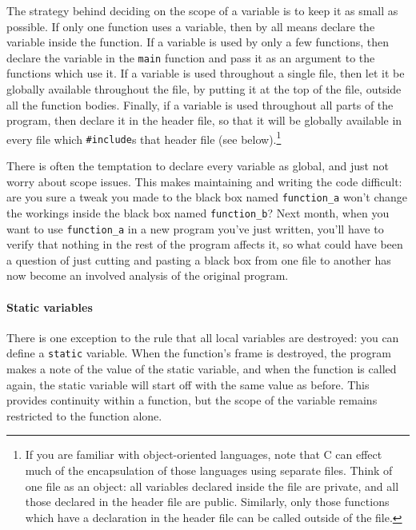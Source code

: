\documentclass[12pt]{article}
\begin{document}
The strategy behind deciding on the scope of a variable is
to keep it as small as possible. If only one function uses a variable,
then by all means declare the variable inside the function.
If a variable is used by only a few functions,
then declare the variable in the {\tt main} function and pass it as an
argument to the functions which use it. If a variable is used throughout
a single file, then let it be globally available throughout the file, by
putting it at the top of the file, outside all the function bodies. Finally,
if a variable is used throughout all parts of the program, then declare it in
the header file, so that it will be globally available in every
file which {\tt \#include}s that header file (see below).\footnote{If
you are familiar with object-oriented languages, note that C can effect
much of the encapsulation of those languages using separate files. Think
of one file as an object: all variables declared inside the file are
private, and all those declared in the header file are public. Similarly,
only those functions which have a declaration in the header file can be
called outside of the file.}

There is often the temptation to declare every variable as global, and
just not worry about scope issues. This makes maintaining and writing
the code difficult: are you sure a tweak you made to the black box named
{\tt function\_a} won't change the workings inside the black box named
{\tt function\_b}? Next month, when you want to use {\tt function\_a}
in a new program you've just written, you'll have to verify that nothing
in the rest of the program affects it, so what could have been a question
of just cutting and pasting a black box from one file to another has
now become an involved analysis of the original program.  

\paragraph{Static variables} There is one exception to the rule that
all local variables are destroyed: you can define a {\tt static}
variable. When the function's frame is destroyed, the program makes a
note of the value of the  static variable, and when the function is called
again, the static variable will start off with the same value
as before. This provides continuity within a function, but the scope
of the variable remains restricted to the function alone.
\end{document}
